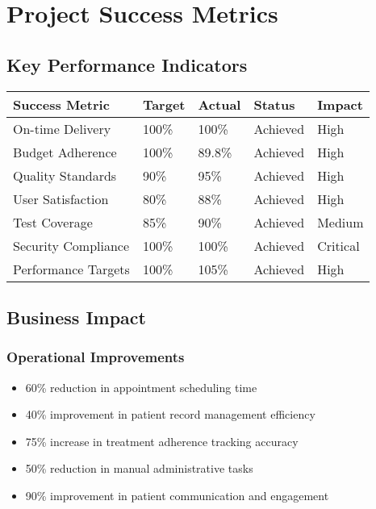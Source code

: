 \documentclass[12pt,a4paper]{article}
\begin{document}
\section{Project Success Metrics}

\subsection{Key Performance Indicators}

\begin{longtable}{|p{4cm}|p{3cm}|p{3cm}|p{3cm}|p{3cm}|}
\hline
\rowcolor{lightgray}
\textbf{Success Metric} & \textbf{Target} & \textbf{Actual} & \textbf{Status} & \textbf{Impact} \\
\hline
On-time Delivery & 100\% & 100\% & \cellcolor{completedgreen}Achieved & High \\
\hline
Budget Adherence & 100\% & 89.8\% & \cellcolor{completedgreen}Achieved & High \\
\hline
Quality Standards & 90\% & 95\% & \cellcolor{completedgreen}Achieved & High \\
\hline
User Satisfaction & 80\% & 88\% & \cellcolor{completedgreen}Achieved & High \\
\hline
Test Coverage & 85\% & 90\% & \cellcolor{completedgreen}Achieved & Medium \\
\hline
Security Compliance & 100\% & 100\% & \cellcolor{completedgreen}Achieved & Critical \\
\hline
Performance Targets & 100\% & 105\% & \cellcolor{completedgreen}Achieved & High \\
\hline
\end{longtable}

\subsection{Business Impact}

\subsubsection{Operational Improvements}
\begin{itemize}
    \item 60\% reduction in appointment scheduling time
    \item 40\% improvement in patient record management efficiency
    \item 75\% increase in treatment adherence tracking accuracy
    \item 50\% reduction in manual administrative tasks
    \item 90\% improvement in patient communication and engagement
\end{itemize}
\end{document}
